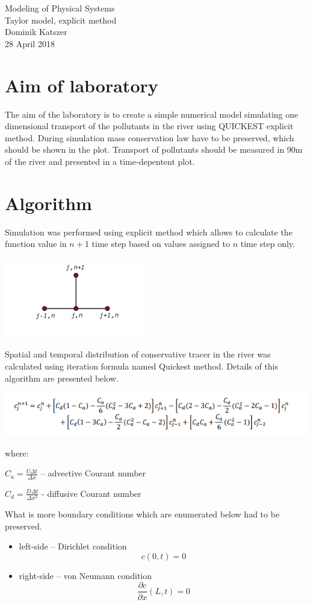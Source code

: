 \documentclass[a4paper,12pt]{article}
\begin{document}
\begin{titlepage}
\center
\vspace*{\fill}
\Huge{Modeling of Physical Systems}\\
\Large{Taylor model, explicit method}\\
\vspace*{1.5cm}
Dominik Katszer\\
\large{28 April 2018}
\vspace*{1.5cm}
\vspace*{\fill}
\end{titlepage}
\section{Aim of laboratory}

The aim of the laboratory is to create a simple numerical model simulating one dimensional
transport of the pollutants in the river using QUICKEST explicit method. During simulation mass conservation law have to be preserved, which should be shown in the plot. 
Transport of pollutants should be measured in 90m of the river and presented in a time-depentent plot.
\section{Algorithm}
Simulation was performed using explicit method which allows to calculate the function value in $n+1$ time step based on values assigned to $n$ time step only.
\\
\centerline{
\includegraphics[scale=1]{explicitMethod.png}
}
Spatial and temporal distribution of conservative tracer in the river was calculated using iteration formula named Quickest method. Details of this algorithm are presented below.
\\
\centerline{
\includegraphics[scale=1]{quickestEq.png}
}
where:
\begin{description}
\item $C_a = \frac{U\Delta t}{\Delta x}$ – advective Courant number
\item $C_d = \frac{D\Delta t}{\Delta x^2}$ - diffusive Courant number
\end{description}
What is more boundary conditions which are enumerated below had to be preserved. 
\begin{itemize}
\item left-side -- Dirichlet condition
$$
c(0,t) = 0
$$
\item right-side -- von Neumann condition
$$
\frac{\partial c}{\partial x}(L,t) = 0
$$
\end{itemize}
\end{document}
